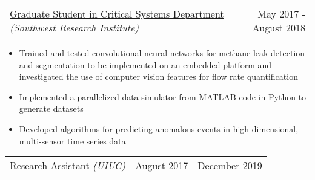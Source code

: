 \documentclass[10pt, letterpaper]{article}
\makeatletter
\newcommand{\headerrow}[2]
{\begin{tabular*}{\linewidth}{l@{\extracolsep{\fill}}r}
	#1 &
	#2 \\
\end{tabular*}}
\makeatother
\begin{document}
\headerrow
	{\uline{Graduate Student in Critical Systems Department} \textit{(Southwest Research Institute)}}
	{May 2017 - August 2018}
	\begin{itemize}
		\item Trained and tested convolutional neural networks for
			methane leak detection and segmentation to be
			implemented on an embedded platform and
			investigated the use of computer vision features for flow rate
			quantification
		\item Implemented a parallelized data simulator from MATLAB code in Python to generate datasets
		\item Developed algorithms for predicting anomalous events in high dimensional, multi-sensor time series data 
	\end{itemize}
	\begin{comment}
	\begin{itemize}%
		\item[] Summer 2017
			\begin{itemize}
				\item Trained and tested convolutional neural networks for methane leak detection and segmentation to be implemented on an NVIDIA Tegra embedded platform
				\item Implemented a parallelized data simulator
					from MATLAB code in Python to generate datasets
				\item Trained several shallow, efficient networks for preliminary investigation for an internal research project
			\end{itemize}
		\item[] Summer 2018
			\begin{itemize} 
				\item Investigated the use of computer vision features with convolutional neural networks for gas leak flow rate quantification
				\item Developed algorithms for predicting anomalous events in high dimensional, multi-sensor time series data 
			\end{itemize}
	\end{itemize}
	\end{comment}

\headerrow
	{\uline{Research Assistant} \textit{(UIUC)}}
	{August 2017 - December 2019}
	\begin{comment}
	\begin{itemize}
		\item Developed online algorithm for unsupervised video object segmentation based on clustering of dense optical flow
		\item Investigated real-time trackers based on discriminative correlation filters
        \item Developed RADAR-video fusion algorithms to generate high
resolution depth maps using electronically scanning RADAR (ESR) sensors found on
modern cars paired with video
	\end{itemize}
	\end{comment}
	\newline %
	
\end{document}
